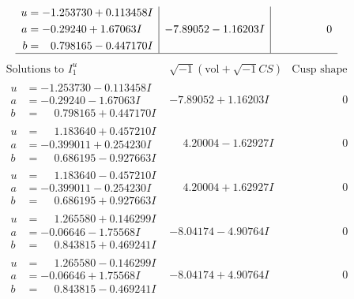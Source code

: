 \documentclass[1p]{elsarticle_modified}
\theoremstyle{definition}
\newcommand{\I}{\sqrt{-1}}
\begin{document}
$$\begin{array}{c|c|c}
\begin{aligned}
u &= -1.253730 + 0.113458 I \\
a &= -0.29240 + 1.67063 I \\
b &= \phantom{-}0.798165 - 0.447170 I\end{aligned}
 & -7.89052 - 1.16203 I & \phantom{-0.000000 } 0\\
 \hline 
 \end{array}$$\newpage$$\begin{array}{c|c|c}  
\text{Solutions to }I^u_{1}& \I (\text{vol} + \sqrt{-1}CS) & \text{Cusp shape}\\
 \hline 
\begin{aligned}
u &= -1.253730 - 0.113458 I \\
a &= -0.29240 - 1.67063 I \\
b &= \phantom{-}0.798165 + 0.447170 I\end{aligned}
 & -7.89052 + 1.16203 I & \phantom{-0.000000 } 0 \\ \hline\begin{aligned}
u &= \phantom{-}1.183640 + 0.457210 I \\
a &= -0.399011 + 0.254230 I \\
b &= \phantom{-}0.686195 - 0.927663 I\end{aligned}
 & \phantom{-}4.20004 - 1.62927 I & \phantom{-0.000000 } 0 \\ \hline\begin{aligned}
u &= \phantom{-}1.183640 - 0.457210 I \\
a &= -0.399011 - 0.254230 I \\
b &= \phantom{-}0.686195 + 0.927663 I\end{aligned}
 & \phantom{-}4.20004 + 1.62927 I & \phantom{-0.000000 } 0 \\ \hline\begin{aligned}
u &= \phantom{-}1.265580 + 0.146299 I \\
a &= -0.06646 - 1.75568 I \\
b &= \phantom{-}0.843815 + 0.469241 I\end{aligned}
 & -8.04174 - 4.90764 I & \phantom{-0.000000 } 0 \\ \hline\begin{aligned}
u &= \phantom{-}1.265580 - 0.146299 I \\
a &= -0.06646 + 1.75568 I \\
b &= \phantom{-}0.843815 - 0.469241 I\end{aligned}
 & -8.04174 + 4.90764 I & \phantom{-0.000000 } 0 \\ \hline\begin{aligned}

\end{aligned}
\end{array}$$
\end{document}
